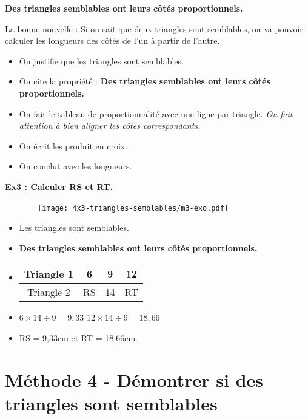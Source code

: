 \textbf{Des triangles semblables ont leurs côtés proportionnels.}

La bonne nouvelle : Si on sait que deux triangles sont semblables, on va pouvoir calculer les longueurs des côtés de l'un à partir de l'autre. 

\begin{itemize}
  \item On justifie que les triangles sont semblables.
  \item On cite la propriété : \textbf{Des triangles semblables ont leurs côtés proportionnels.} 
  \item On fait le tableau de proportionnalité avec une ligne par triangle. \textit{On fait attention à bien aligner les côtés correspondants.}
  \item On écrit les produit en croix. 
  \item On conclut avec les longueurs. 
\end{itemize}

\horrule{1px}
\textbf{Ex3 : Calculer RS et RT.}

\begin{multicols}{2}

  \begin{figure}[H]
    \centering
    \texttt{[image: 4x3-triangles-semblables/m3-exo.pdf]}
  \end{figure}
  \columnbreak

  \begin{itemize}[label={$\bullet$}]
    \item Les triangles sont semblables.
    \item \textbf{Des triangles semblables ont leurs côtés proportionnels.} 
    \item     
    \begin{tabular}{|c|c|c|c|}
      \hline
      Triangle 1 & 6 & 9 & 12 \\  \hline
      Triangle 2 & RS & 14 & RT\\  \hline
    \end{tabular}
    \item $6  \times 14 \div 9 = 9,33$ \newline
          $12 \times 14 \div 9 = 18,66$
    \item RS = 9,33cm et RT = 18,66cm.
  \end{itemize}

\end{multicols}

\section*{Méthode 4 - Démontrer si des triangles sont semblables}

